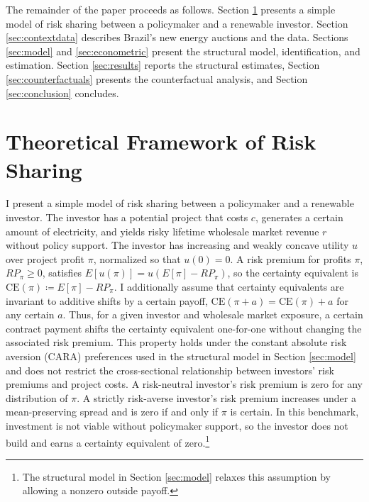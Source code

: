 \documentclass[12pt]{article}
\theoremstyle{definition} %
\begin{document}

The remainder of the paper proceeds as follows. Section \ref{sec:theory} presents a simple model of risk sharing between a policymaker and a renewable investor. Section \ref{sec:contextdata} describes Brazil's new energy auctions and the data. Sections \ref{sec:model} and \ref{sec:econometric} present the structural model, identification, and estimation. Section \ref{sec:results} reports the structural estimates, Section \ref{sec:counterfactuals} presents the counterfactual analysis, and Section \ref{sec:conclusion} concludes.

\section{Theoretical Framework of Risk Sharing}
\label{sec:theory}

I present a simple model of risk sharing between a policymaker and a renewable investor. The investor has a potential project that costs $c$, generates a certain amount of electricity, and yields risky lifetime wholesale market revenue $r$ without policy support. The investor has increasing and weakly concave utility $u$ over project profit $\pi$, normalized so that $u(0)=0$. A risk premium for profits $\pi$, $RP_\pi \geq 0$, satisfies $E[u(\pi)] = u(E[\pi] - RP_\pi)$, so the certainty equivalent is $\mathrm{CE}(\pi)\coloneqq E[\pi]-RP_\pi$. I additionally assume that certainty equivalents are invariant to additive shifts by a certain payoff, $\mathrm{CE}(\pi+a)=\mathrm{CE}(\pi)+a$ for any certain $a$. Thus, for a given investor and wholesale market exposure, a certain contract payment shifts the certainty equivalent one-for-one without changing the associated risk premium. This property holds under the constant absolute risk aversion (CARA) preferences used in the structural model in Section \ref{sec:model} and does not restrict the cross-sectional relationship between investors' risk premiums and project costs. A risk-neutral investor's risk premium is zero for any distribution of $\pi $. A strictly risk-averse investor's risk premium increases under a mean-preserving spread and is zero if and only if $\pi $ is certain. In this benchmark, investment is not viable without policymaker support, so the investor does not build and earns a certainty equivalent of zero.\footnote{The structural model in Section \ref{sec:model} relaxes this assumption by allowing a nonzero outside payoff.}
\end{document}
